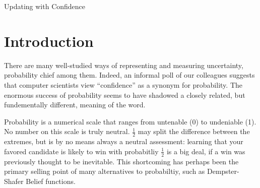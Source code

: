 \documentclass{article}
\begin{document}
\begin{center}
	\Huge 
	Updating with Confidence
\end{center}

\section{Introduction}
\def\stmt{$A$}

There are many well-studied ways of representing and measuring uncertainty,
probability chief among them. 
Indeed, an informal poll of our colleagues suggests that computer scientists view ``confidence'' as a synonym for probability. 
The enormous success of probability seems to have shadowed a closely related, but fundementally different, meaning of the word. 



Probability is a numerical scale that ranges from untenable (0) to undeniable (1). 
No number on this scale is truly neutral.
$\frac12$ may split the difference between the extremes, but is by no means always a neutral assessment: learning that your favored candidate is likely to win with probabitliy $\frac12$ is a big deal, if a win was previously thought to be inevitable. 
This shortcoming has perhaps been the primary selling point of many alternatives to probabiltiy, such as Dempster-Shafer Belief functions. 
\end{document}
